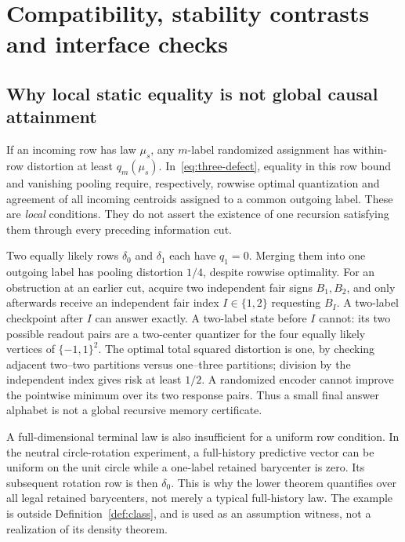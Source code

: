 \section{Compatibility, stability contrasts and interface checks}\label{sec:compatibility}
\subsection{Why local static equality is not global causal attainment}
If an incoming row has law $\mu_s$, any $m$-label randomized assignment has within-row distortion at least $q_m(\mu_s)$. In~\eqref{eq:three-defect}, equality in this row bound and vanishing pooling require, respectively, rowwise optimal quantization and agreement of all incoming centroids assigned to a common outgoing label. These are \emph{local} conditions. They do not assert the existence of one recursion satisfying them through every preceding information cut.

\begin{example}\label{ex:compatibility}
Two equally likely rows $\delta_0$ and $\delta_1$ each have $q_1=0$. Merging them into one outgoing label has pooling distortion $1/4$, despite rowwise optimality. For an obstruction at an earlier cut, acquire two independent fair signs $B_1,B_2$, and only afterwards receive an independent fair index $I\in\{1,2\}$ requesting $B_I$. A two-label checkpoint after $I$ can answer exactly. A two-label state before $I$ cannot: its two possible readout pairs are a two-center quantizer for the four equally likely vertices of $\{-1,1\}^2$. The optimal total squared distortion is one, by checking adjacent two--two partitions versus one--three partitions; division by the independent index gives risk at least $1/2$. A randomized encoder cannot improve the pointwise minimum over its two response pairs. Thus a small final answer alphabet is not a global recursive memory certificate.
\end{example}

A full-dimensional terminal law is also insufficient for a uniform row condition. In the neutral circle-rotation experiment, a full-history predictive vector can be uniform on the unit circle while a one-label retained barycenter is zero. Its subsequent rotation row is then $\delta_0$. This is why the lower theorem quantifies over all legal retained barycenters, not merely a typical full-history law. The example is outside Definition~\ref{def:class}, and is used as an assumption witness, not a realization of its density theorem.

